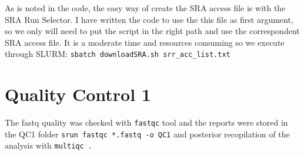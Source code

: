 \documentclass[
]{book}
\newenvironment{Shaded}{\begin{snugshade}}{\end{snugshade}}
\newcommand{\CommentTok}[1]{\textcolor[rgb]{0.56,0.35,0.01}{\textit{#1}}}
\newcommand{\ControlFlowTok}[1]{\textcolor[rgb]{0.13,0.29,0.53}{\textbf{#1}}}
\newcommand{\DecValTok}[1]{\textcolor[rgb]{0.00,0.00,0.81}{#1}}
\newcommand{\ErrorTok}[1]{\textcolor[rgb]{0.64,0.00,0.00}{\textbf{#1}}}
\newcommand{\NormalTok}[1]{#1}
\newcommand{\OtherTok}[1]{\textcolor[rgb]{0.56,0.35,0.01}{#1}}
\newcommand{\SpecialCharTok}[1]{\textcolor[rgb]{0.00,0.00,0.00}{#1}}
\begin{document}
\begin{Shaded}
\end{Shaded}

As is noted in the code, the easy way of create the SRA access file is with the SRA Run Selector. I have written the code to use the this file as first argument, so we only will need to put the script in the right path and use the correspondent SRA access file. It is a moderate time and resources consuming so we execute through SLURM: \texttt{sbatch\ downloadSRA.sh\ srr\_acc\_list.txt}

\hypertarget{quality-control-1}{%
\section{Quality Control 1}\label{quality-control-1}}

The fastq quality was checked with \texttt{fastqc} tool and the reports were stored in the QC1 folder
\texttt{srun\ fastqc\ *.fastq\ -o\ QC1} and posterior recopilation of the analysis with \texttt{multiqc\ .}
\end{document}
